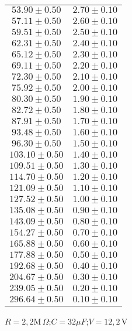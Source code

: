 \documentclass[12pt, letterpaper]{article} %
\theoremstyle{plain} %
\begin{document}
\begin{figure}[H]
\begin{minipage}[t]{0.48\textwidth}
\begin{minipage}[t]{\linewidth}
\begin{tabular}{|c|c|}
$53.90 \pm 0.50$ & $2.70 \pm 0.10$ \\
$57.11 \pm 0.50$ & $2.60 \pm 0.10$ \\
$59.51 \pm 0.50$ & $2.50 \pm 0.10$ \\
$62.31 \pm 0.50$ & $2.40 \pm 0.10$ \\
$65.12 \pm 0.50$ & $2.30 \pm 0.10$ \\
$69.11 \pm 0.50$ & $2.20 \pm 0.10$ \\
$72.30 \pm 0.50$ & $2.10 \pm 0.10$ \\
$75.92 \pm 0.50$ & $2.00 \pm 0.10$ \\
$80.30 \pm 0.50$ & $1.90 \pm 0.10$ \\
$82.72 \pm 0.50$ & $1.80 \pm 0.10$ \\
$87.91 \pm 0.50$ & $1.70 \pm 0.10$ \\
$93.48 \pm 0.50$ & $1.60 \pm 0.10$ \\
$96.30 \pm 0.50$ & $1.50 \pm 0.10$ \\
$103.10 \pm 0.50$ & $1.40 \pm 0.10$ \\
$109.51 \pm 0.50$ & $1.30 \pm 0.10$ \\
$114.70 \pm 0.50$ & $1.20 \pm 0.10$ \\
$121.09 \pm 0.50$ & $1.10 \pm 0.10$ \\
$127.52 \pm 0.50$ & $1.00 \pm 0.10$ \\
$135.08 \pm 0.50$ & $0.90 \pm 0.10$ \\
$143.09 \pm 0.50$ & $0.80 \pm 0.10$ \\
$154.27 \pm 0.50$ & $0.70 \pm 0.10$ \\
$165.88 \pm 0.50$ & $0.60 \pm 0.10$ \\
$177.88 \pm 0.50$ & $0.50 \pm 0.10$ \\
$192.68 \pm 0.50$ & $0.40 \pm 0.10$ \\
$204.67 \pm 0.50$ & $0.30 \pm 0.10$ \\
$239.05 \pm 0.50$ & $0.20 \pm 0.10$ \\
$296.64 \pm 0.50$ & $0.10 \pm 0.10$ \\
\hline
\end{tabular}
\caption*{$R = 2,2\text{M}\,\Omega$;$C = 32\mu F$;$V = 12,2$\,V}
\end{minipage}


\end{minipage}
\end{figure}
\end{document}
